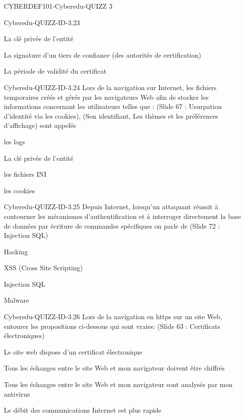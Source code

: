 \documentclass[12pt]{article}
\begin{document}
\begin{quiz}{CYBERDEF101-Cyberedu-QUIZZ 3}
\begin{multi}[multiple=true]{Cyberedu-QUIZZ-ID-3.23}
\item La cl\'e priv\'ee de l'entit\'e
\item* La signature d'un tiers de confiance (des autorit\'es de certification)
\item* La p\'eriode de validit\'e du certificat
\end{multi}
\begin{multi}[multiple=true]{Cyberedu-QUIZZ-ID-3.24}
	Lors de la navigation sur Internet, les  fichiers temporaires cr\'e\'es et g\'er\'es par les navigateurs Web afin de stocker les informations concernant les utilisateurs telles que : (Slide 67 : Usurpation d'identit\'e via les cookies), (Son identifiant, Les th\`emes et les pr\'ef\'erences d'affichage) sont appel\'es
\item les logs
\item La cl\'e priv\'ee de l'entit\'e
\item les fichiers INI
\item* les cookies
\end{multi}
\begin{multi}[multiple=true]{Cyberedu-QUIZZ-ID-3.25}
	Depuis Internet, lorsqu'un attaquant r\'eussit \`{a} contourner les m\'ecanismes d'authentification et \`{a} interroger directement la base de donn\'ees  par \'ecriture de commandes sp\'ecifiques on parle de (Slide 72 : Injection SQL)
\item Hacking
\item XSS (Cross Site Scripting)
\item* Injection SQL
\item Malware
\end{multi}
\begin{multi}[multiple=true]{Cyberedu-QUIZZ-ID-3.26}
	Lors de la navigation en https sur un site Web, entourer les propositions ci-dessous qui sont vraies: (Slide 63 : Certificats \'electroniques)
\item* Le site web dispose d'un certificat \'electronique
\item* Tous les \'echanges entre le site Web et mon navigateur doivent \^etre chiffr\'es
\item Tous les \'echanges entre le site Web et mon navigateur sont analys\'es par mon antivirus
\item Le d\'ebit des communications Internet est plus rapide
\end{multi}

\end{quiz}
\end{document}
